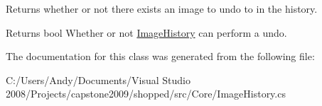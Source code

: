 \label{class_core_1_1_image_history_a45908055c40dd586e4f426b7eab3ee3e}
Returns whether or not there exists an image to undo to in the history.

\begin{DoxyReturn}{Returns}
bool Whether or not \hyperlink{class_core_1_1_image_history}{ImageHistory} can perform a undo. 
\end{DoxyReturn}


The documentation for this class was generated from the following file:\begin{DoxyCompactItemize}
\item 
C:/Users/Andy/Documents/Visual Studio 2008/Projects/capstone2009/shopped/src/Core/ImageHistory.cs\end{DoxyCompactItemize}
